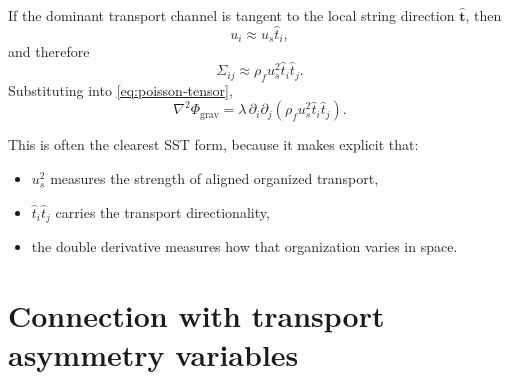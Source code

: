 \documentclass[11pt]{article}
\newcommand{\rhoF}{\rho_{\!f}}
\newcommand{\grav}{\mathrm{grav}}
\begin{document}
        If the dominant transport channel is tangent to the local string direction \(\hat{\mathbf t}\), then
        \[
            u_i \approx u_s \hat t_i,
        \]
        and therefore
        \begin{equation}
            \Sigma_{ij}
            \approx
            \rhoF u_s^2 \hat t_i \hat t_j.
            \label{eq:Sigma-aligned}
        \end{equation}
        Substituting into \eqref{eq:poisson-tensor},
        \begin{equation}
            \boxed{
                \nabla^2 \Phi_{\grav}
                =
                \lambda\,\partial_i\partial_j
                \left(
                    \rhoF u_s^2 \hat t_i \hat t_j
                \right).
            }
            \label{eq:poisson-aligned}
        \end{equation}
        
        This is often the clearest SST form, because it makes explicit that:
        \begin{itemize}
            \item \(u_s^2\) measures the strength of aligned organized transport,
            \item \(\hat t_i \hat t_j\) carries the transport directionality,
            \item the double derivative measures how that organization varies in space.
        \end{itemize}
        
        \section{Connection with transport asymmetry variables}
        
\end{document}
